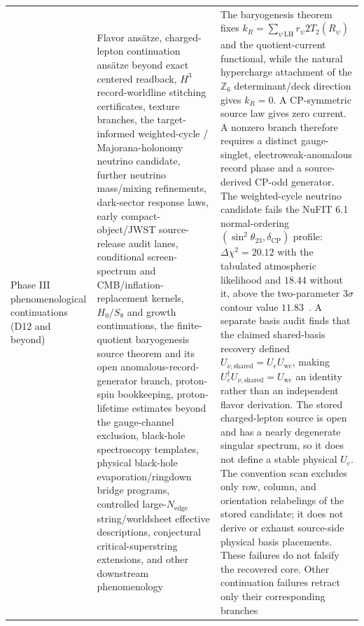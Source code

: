 \documentclass[11pt]{article}
\begin{document}
\begin{longtable}{@{}>{\raggedright\arraybackslash}p{}>{\raggedright\arraybackslash}p{}>{\raggedright\arraybackslash}p{}@{}}
Phase III phenomenological continuations (D12 and beyond) & Flavor ans\"atze, charged-lepton continuation ans\"atze beyond exact centered readback, \(H^3\) record-worldline stitching certificates, texture branches, the target-informed weighted-cycle / Majorana-holonomy neutrino candidate, further neutrino mass/mixing refinements, dark-sector response laws, early compact-object/JWST source-release audit lanes, conditional screen-spectrum and CMB/inflation-replacement kernels, \(H_0/S_8\) and growth continuations, the finite-quotient baryogenesis source theorem and its open anomalous-record-generator branch, proton-spin bookkeeping, proton-lifetime estimates beyond the gauge-channel exclusion, black-hole spectroscopy templates, physical black-hole evaporation/ringdown bridge programs, controlled large-\(N_{\mathrm{edge}}\) string/worldsheet effective descriptions, conjectural critical-superstring extensions, and other downstream phenomenology & The baryogenesis theorem fixes \(k_R=\sum_{\psi\,\mathrm{LH}}r_\psi2T_2(R_\psi)\) and the quotient-current functional, while the natural hypercharge attachment of the \(\mathbb Z_6\) determinant/deck direction gives \(k_R=0\). A CP-symmetric source law gives zero current. A nonzero branch therefore requires a distinct gauge-singlet, electroweak-anomalous record phase and a source-derived CP-odd generator. The weighted-cycle neutrino candidate fails the NuFIT 6.1 normal-ordering \((\sin^2\theta_{23},\delta_{\mathrm{CP}})\) profile: \(\Delta\chi^2=20.12\) with the tabulated atmospheric likelihood and \(18.44\) without it, above the two-parameter \(3\sigma\) contour value \(11.83\)~\cite{nufit61}. A separate basis audit finds that the claimed shared-basis recovery defined \(U_{\nu,\mathrm{shared}}=U_eU_{\mathrm{wc}}\), making \(U_e^\dagger U_{\nu,\mathrm{shared}}=U_{\mathrm{wc}}\) an identity rather than an independent flavor derivation. The stored charged-lepton source is open and has a nearly degenerate singular spectrum, so it does not define a stable physical \(U_e\). The convention scan excludes only row, column, and orientation relabelings of the stored candidate; it does not derive or exhaust source-side physical basis placements. These failures do not falsify the recovered core. Other continuation failures retract only their corresponding branches \\
\end{longtable}
\endgroup
\end{document}

